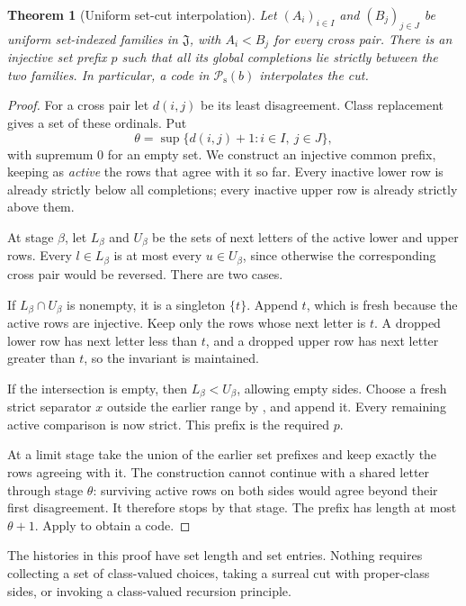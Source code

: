 \documentclass[11pt]{article}
\newtheorem{theorem}{Theorem}[section]
\theoremstyle{definition}
\theoremstyle{remark}
\newcommand{\Jinj}{\mathfrak J}
\newcommand{\Psupp}{\mathcal P_{\mathrm{s}}}
\begin{document}
\begin{theorem}[Uniform set-cut interpolation]\label{swo:fs:thm:interpolate}
Let $(A_i)_{i\in I}$ and $(B_j)_{j\in J}$ be uniform set-indexed
families in $\Jinj$, with $A_i<B_j$ for every cross pair. There is an
injective set prefix $p$ such that all its global completions lie
strictly between the two families. In particular, a code in $\Psupp(b)$
interpolates the cut.
\end{theorem}
\begin{proof}
For a cross pair let $d(i,j)$ be its least disagreement. Class
replacement gives a set of these ordinals. Put
\[
               \theta=\sup\{d(i,j)+1:i\in I,\ j\in J\},
\]
with supremum $0$ for an empty set. We construct an injective common
prefix, keeping as \emph{active} the rows that agree with it so far.
Every inactive lower row is already strictly below all completions;
every inactive upper row is already strictly above them.

At stage $\beta$, let $L_\beta$ and $U_\beta$ be the sets of next
letters of the active lower and upper rows. Every $l\in L_\beta$ is
at most every $u\in U_\beta$, since otherwise the corresponding
cross pair would be reversed. There are two cases.

If $L_\beta\cap U_\beta$ is nonempty, it is a singleton $\{t\}$.
Append $t$, which is fresh because the active rows are injective.
Keep only the rows whose next letter is $t$. A dropped lower row has
next letter less than $t$, and a dropped upper row has next letter
greater than $t$, so the invariant is maintained.

If the intersection is empty, then $L_\beta<U_\beta$, allowing empty
sides. Choose a fresh strict separator $x$ outside the earlier range
by , and append it. Every remaining active
comparison is now strict. This prefix is the required $p$.

At a limit stage take the union of the earlier set prefixes and keep
exactly the rows agreeing with it. The construction cannot continue
with a shared letter through stage $\theta$: surviving active rows on
both sides would agree beyond their first disagreement. It therefore
stops by that stage. The prefix has length at most $\theta+1$.
Apply  to obtain a code.
\end{proof}

The histories in this proof have set length and set entries. Nothing
requires collecting a set of class-valued choices, taking a surreal
cut with proper-class sides, or invoking a class-valued recursion
principle.
\end{document}
